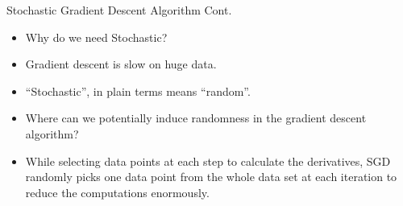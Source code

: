 \begin{frame}{Stochastic Gradient Descent Algorithm Cont.}
    \begin{itemize}
        \item Why do we need Stochastic?
        \item Gradient descent is slow on huge data.
        \item “Stochastic”, in plain terms means “random”.
        \item Where can we potentially induce randomness in the gradient descent algorithm?
        \item While selecting data points at each step to calculate the derivatives, SGD randomly picks one data point from the whole data set at each iteration to reduce the computations enormously.
    \end{itemize}
\end{frame}